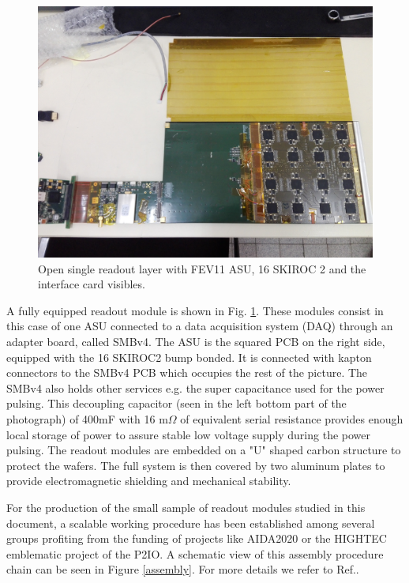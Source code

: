 \documentclass[a4paper,11pt]{article}
\begin{document}
\begin{figure}[!ht]
  \centering
    \includegraphics[width=6in]{short_slab_bga_13.jpg} 
  \caption{Open single readout layer with FEV11 ASU, 16 SKIROC 2 and the interface card visibles. }
\label{ASU2}
\end{figure}

A fully equipped readout module is shown in Fig. \ref{ASU2}. These modules consist in this case of one ASU
connected to a data acquisition system (DAQ) through an adapter board, called SMBv4.
The ASU is the squared PCB on the right side, equipped with the 16 SKIROC2 bump bonded.
It is connected with kapton connectors to the SMBv4 PCB which occupies the rest of the picture.
The SMBv4 also holds other
services e.g. the super capacitance used for the power pulsing. 
This decoupling capacitor (seen in the left bottom part of the photograph)
 of 400mF with 16 m$\Omega$ of equivalent serial resistance
provides enough local storage 
of power to assure stable low voltage supply during the power pulsing. %
The readout modules are embedded on a "U" shaped carbon structure to protect the wafers.
The full system is then covered by two aluminum plates
to provide electromagnetic shielding and mechanical stability.

For the production of the small sample of readout modules studied in this document,
a scalable working procedure has been established among several groups \cite{Boudry:2318814}
profiting from the funding of projects like AIDA2020 or the HIGHTEC emblematic project
of the P2IO. A schematic view of this assembly procedure chain can be seen in
Figure \ref{assembly}. For more details we refer to Ref.\cite{Boudry:2318814}.
\end{document}

